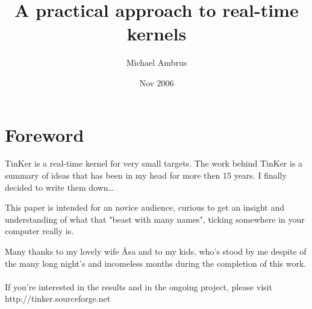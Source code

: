 \documentclass[a4paper,10pt]{book}
\begin{document}
\title{A practical approach to real-time kernels}
\author{Michael Ambrus} 
\date{Nov 2006}
\maketitle


\chapter{Foreword}
\label{FIXME}
	TinKer is a real-time kernel for very small targets. The work behind TinKer is a summary of ideas that has been in my head for more then 15 years. I finally decided to write them down\ldots

	This paper is intended for an novice audience, curious to get an insight and understanding of what that "beast with many names", ticking somewhere in your computer really is.

	Many thanks to my lovely wife \AA sa and to my kids, who's stood by me despite of the many long night's and incomeless months during the completion of this work.
\\\\
	If you're interested in the results and in the ongoing project, please visit http://tinker.sourceforge.net

\tableofcontents
\mainmatter

\listoffigures 
\listoftables
\end{document}
